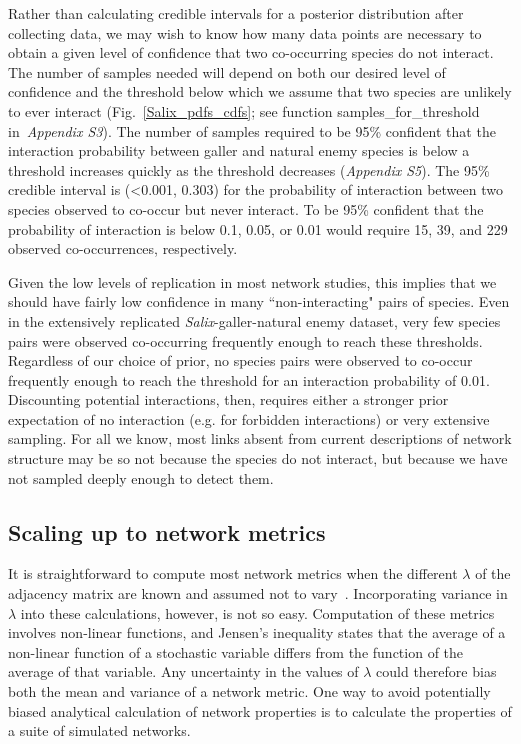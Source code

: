 \documentclass[12pt]{article}
\begin{document}
\begin{spacing}{2.0}
      Rather than calculating credible intervals for a posterior distribution after collecting data, we may wish to know how many data points are necessary to obtain a given level of confidence that two co-occurring species do not interact. The number of samples needed will depend on both our desired level of confidence and the threshold below which we assume that two species are unlikely to ever interact (Fig.~\ref{Salix_pdfs_cdfs}; see function samples\_for\_threshold in~\emph{Appendix S3}). The number of samples required to be 95\% confident that the interaction probability between galler and natural enemy species is below a threshold increases quickly as the threshold decreases (\emph{Appendix S5}). The 95\% credible interval is (\textless0.001, 0.303) for the probability of interaction between two species observed to co-occur but never interact. To be 95\% confident that the probability of interaction is below 0.1, 0.05, or 0.01 would require 15, 39, and 229 observed co-occurrences, respectively.


      Given the low levels of replication in most network studies, this implies that we should have fairly low confidence in many ``non-interacting" pairs of species. Even in the extensively replicated \emph{Salix}-galler-natural enemy dataset, very few species pairs were observed co-occurring frequently enough to reach these thresholds.  Regardless of our choice of prior, no species pairs were observed to co-occur frequently enough to reach the threshold for an interaction probability of 0.01. Discounting potential interactions, then, requires either a stronger prior expectation of no interaction (e.g. for forbidden interactions) or very extensive sampling. For all we know, most links absent from current descriptions of network structure may be so not because the species do not interact, but because we have not sampled deeply enough to detect them.


  \subsection*{Scaling up to network metrics}

    It is straightforward to compute most network metrics when the different $\lambda$ of the adjacency matrix are known and assumed not to vary~\citep{Poisot2016}. Incorporating variance in $\lambda$ into these calculations, however, is not so easy. Computation of these metrics involves non-linear functions, and Jensen's inequality states that the average of a non-linear function of a stochastic variable differs from the function of the average of that variable. Any uncertainty in the values of $\lambda$ could therefore bias both the mean and variance of a network metric. One way to avoid potentially biased analytical calculation of network properties is to calculate the properties of a suite of simulated networks.



\end{spacing}
\end{document}
